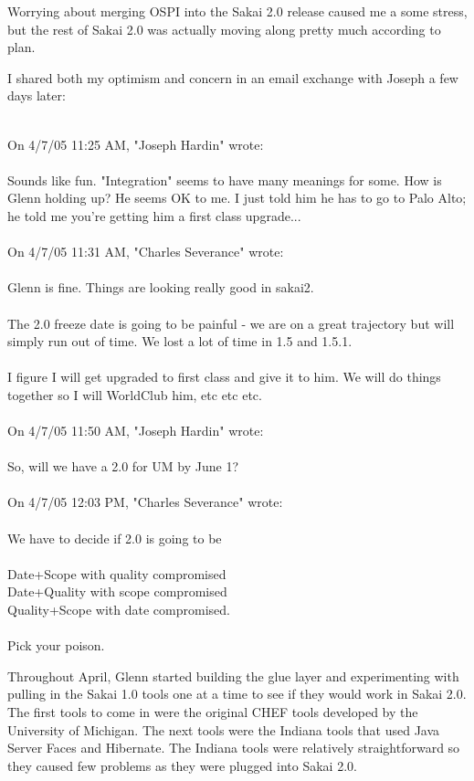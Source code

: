 \documentclass[12pt]{book}
\begin{document}
Worrying about merging OSPI into the Sakai 2.0 release
caused me a some stress,
but the rest of Sakai 2.0 was actually moving
along pretty much according to plan.

I shared both my optimism and concern in an email exchange
with Joseph a few days later:\\
\\
\begin{sf}
On 4/7/05 11:25 AM, "Joseph Hardin" wrote:\\
\\
Sounds like fun.  "Integration" seems to have many
meanings for some.  How is Glenn holding up? He seems
OK to me.  I just told him he has to go to Palo Alto;
he told me you're getting him a first class upgrade...\\
\\
On 4/7/05 11:31 AM, "Charles Severance" wrote:\\
\\
Glenn is fine.  Things are looking really good in sakai2.\\
\\
The 2.0 freeze date is going to be painful - we are
on a great trajectory but will simply run out of time.
We lost a lot of time in 1.5 and 1.5.1.  \\
\\
I figure I will get upgraded to first class and give
it to him.  We will do things together so I will
WorldClub him, etc etc etc.\\
\\
On 4/7/05 11:50 AM, "Joseph Hardin" wrote:\\
\\
So, will we have a 2.0 for UM by June 1?\\
\\
On 4/7/05 12:03 PM, "Charles Severance" wrote:\\
\\
We have to decide if 2.0 is going to be\\
\\
Date+Scope with quality compromised\\
Date+Quality with scope compromised\\
Quality+Scope with date compromised.\\
\\
Pick your poison.\\
\end{sf}

Throughout April, Glenn started building the glue layer
and experimenting with pulling in the Sakai 1.0 tools
one at a time to see if they would work in Sakai 2.0.
The first tools to come in were the original CHEF tools
developed by the University of Michigan. The next tools
were the Indiana tools that used Java Server Faces
and Hibernate.  The Indiana tools were relatively
straightforward so they caused few problems as
they were plugged into Sakai 2.0.
\end{document}

